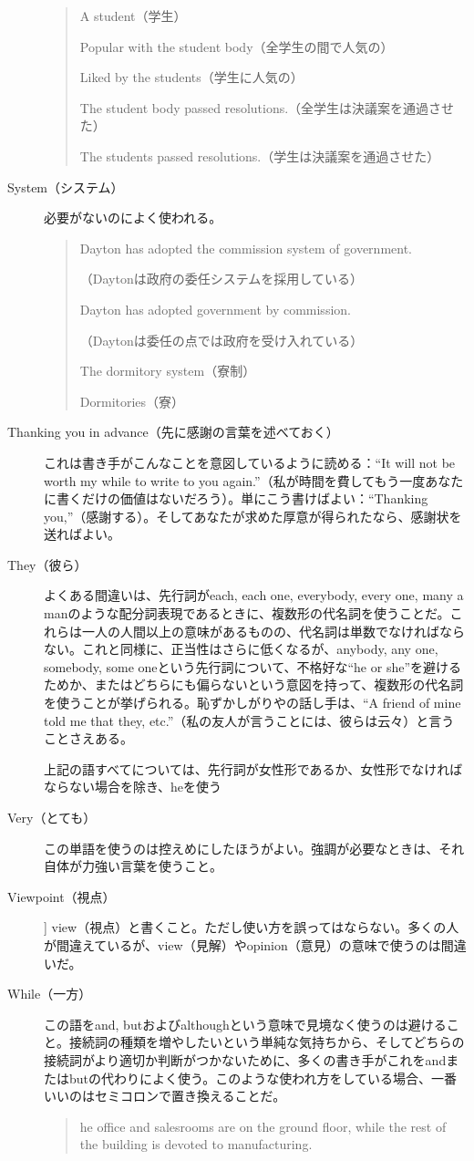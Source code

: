 \begin{description}
\begin{quote}
    A student（学生）
    
    Popular with the student body（全学生の間で人気の）
    
    Liked by the students（学生に人気の）
    
    The student body passed resolutions.（全学生は決議案を通過させた）
    
    The students passed resolutions.（学生は決議案を通過させた）
\end{quote}
\item [System（システム）]必要がないのによく使われる。
\begin{quote}
    Dayton has adopted the commission system of government.
    
    （Daytonは政府の委任システムを採用している）
    
    Dayton has adopted government by commission.
    
    （Daytonは委任の点では政府を受け入れている）
    
    The dormitory system（寮制）
    
    Dormitories（寮）
\end{quote}
\item[Thanking you in advance（先に感謝の言葉を述べておく）]これは書き手がこんなことを意図しているように読める：``It will not
be worth my while to write to you
again.''（私が時間を費してもう一度あなたに書くだけの価値はないだろう）。単にこう書けばよい：``Thanking
you,''（感謝する）。そしてあなたが求めた厚意が得られたなら、感謝状を送ればよい。
\item[They（彼ら）]よくある間違いは、先行詞がeach, each one, everybody, every one,
many a
manのような配分詞表現であるときに、複数形の代名詞を使うことだ。これらは一人の人間以上の意味があるものの、代名詞は単数でなければならない。これと同様に、正当性はさらに低くなるが、anybody,
any one, somebody, some oneという先行詞について、不格好な``he or
she''を避けるためか、またはどちらにも偏らないという意図を持って、複数形の代名詞を使うことが挙げられる。恥ずかしがりやの話し手は、``A
friend of mine told me that they,
etc.''（私の友人が言うことには、彼らは云々）と言うことさえある。 \par 上記の語すべてについては、先行詞が女性形であるか、女性形でなければならない場合を除き、heを使う
\item[Very（とても）]この単語を使うのは控えめにしたほうがよい。強調が必要なときは、それ自体が力強い言葉を使うこと。
\item [Viewpoint（視点）]] view（視点）と書くこと。ただし使い方を誤ってはならない。多くの人が間違えているが、view（見解）やopinion（意見）の意味で使うのは間違いだ。
\item[While（一方）]この語をand,
butおよびalthoughという意味で見境なく使うのは避けること。接続詞の種類を増やしたいという単純な気持ちから、そしてどちらの接続詞がより適切か判断がつかないために、多くの書き手がこれをandまたはbutの代わりによく使う。このような使われ方をしている場合、一番いいのはセミコロンで置き換えることだ。
\begin{quote}
    he office and salesrooms are on the ground floor, while the rest
of the building is devoted to manufacturing.


\end{quote}
\end{description}
